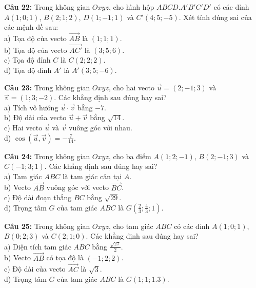 \documentclass[12pt]{article}
\begin{document}
	\vspace{4mm}
	\noindent \textbf{Câu 22:} Trong không gian $Oxyz$, cho hình hộp $ABCD.A'B'C'D'$ có các đỉnh $A(1; 0; 1)$, $B(2; 1; 2)$, $D(1; -1; 1)$ và $C'(4; 5; -5)$. Xét tính đúng sai của các mệnh đề sau: \\
	\noindent a) Tọa độ của vecto $\vec{AB}$ là $(1; 1; 1)$. \\
	\noindent b) Tọa độ của vecto $\vec{AC'}$ là $(3; 5; 6)$. \\
	\noindent c) Tọa độ đỉnh $C$ là $C(2; 2; 2)$. \\
	\noindent d) Tọa độ đỉnh $A'$ là $A'(3; 5; -6)$.
	
	\vspace{4mm}
	\noindent \textbf{Câu 23:} Trong không gian $Oxyz$, cho hai vecto $\vec{u} = (2; -1; 3)$ và $\vec{v} = (1; 3; -2)$. Các khẳng định sau đúng hay sai? \\
	\noindent a) Tích vô hướng $\vec{u} \cdot \vec{v}$ bằng $-7$. \\
	\noindent b) Độ dài của vecto $\vec{u} + \vec{v}$ bằng $\sqrt{14}$. \\
	\noindent c) Hai vecto $\vec{u}$ và $\vec{v}$ vuông góc với nhau. \\
	\noindent d) $\cos(\vec{u}, \vec{v}) = -\frac{7}{14}$.
	
	\vspace{4mm}
	\noindent \textbf{Câu 24:} Trong không gian $Oxyz$, cho ba điểm $A(1; 2; -1)$, $B(2; -1; 3)$ và $C(-1; 3; 1)$. Các khẳng định sau đúng hay sai? \\
	\noindent a) Tam giác $ABC$ là tam giác cân tại $A$. \\
	\noindent b) Vecto $\vec{AB}$ vuông góc với vecto $\vec{BC}$. \\
	\noindent c) Độ dài đoạn thẳng $BC$ bằng $\sqrt{29}$. \\
	\noindent d) Trọng tâm $G$ của tam giác $ABC$ là $G\left(\frac{2}{3}; \frac{4}{3}; 1\right)$.
	
	\vspace{4mm}
	\noindent \textbf{Câu 25:} Trong không gian $Oxyz$, cho tam giác $ABC$ có các đỉnh $A(1; 0; 1)$, $B(0; 2; 3)$ và $C(2; 1; 0)$. Các khẳng định sau đúng hay sai? \\
	\noindent a) Diện tích tam giác $ABC$ bằng $\frac{\sqrt{27}}{2}$. \\
	\noindent b) Vecto $\vec{AB}$ có tọa độ là $(-1; 2; 2)$. \\
	\noindent c) Độ dài của vecto $\vec{AC}$ là $\sqrt{3}$. \\
	\noindent d) Trọng tâm $G$ của tam giác $ABC$ là $G(1; 1; 1.3)$.
	
\end{document}
